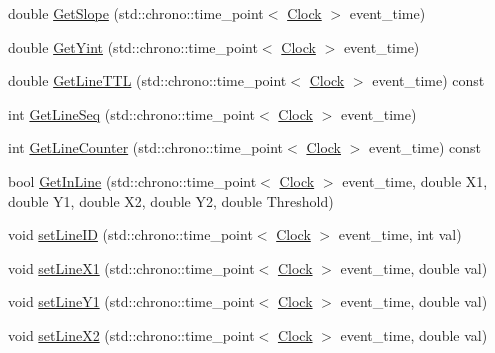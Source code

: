 \begin{DoxyCompactItemize}
\item 
double \mbox{\hyperlink{classLine_a2be3926d47a1a8849007a6c29a603dcf}{Get\+Slope}} (std\+::chrono\+::time\+\_\+point$<$ \mbox{\hyperlink{universe_8h_a0ef8d951d1ca5ab3cfaf7ab4c7a6fd80}{Clock}} $>$ event\+\_\+time)
\item 
double \mbox{\hyperlink{classLine_a5319d68ecb254ff61e2a46d5928aec93}{Get\+Yint}} (std\+::chrono\+::time\+\_\+point$<$ \mbox{\hyperlink{universe_8h_a0ef8d951d1ca5ab3cfaf7ab4c7a6fd80}{Clock}} $>$ event\+\_\+time)
\item 
double \mbox{\hyperlink{classLine_a5b9419146093908e5c7d740ac384fe39}{Get\+Line\+T\+TL}} (std\+::chrono\+::time\+\_\+point$<$ \mbox{\hyperlink{universe_8h_a0ef8d951d1ca5ab3cfaf7ab4c7a6fd80}{Clock}} $>$ event\+\_\+time) const
\item 
int \mbox{\hyperlink{classLine_a8764cb987ec4af839f30411dc47a835a}{Get\+Line\+Seq}} (std\+::chrono\+::time\+\_\+point$<$ \mbox{\hyperlink{universe_8h_a0ef8d951d1ca5ab3cfaf7ab4c7a6fd80}{Clock}} $>$ event\+\_\+time)
\item 
int \mbox{\hyperlink{classLine_ac13c6405cfd2a586633b5a5eece05fff}{Get\+Line\+Counter}} (std\+::chrono\+::time\+\_\+point$<$ \mbox{\hyperlink{universe_8h_a0ef8d951d1ca5ab3cfaf7ab4c7a6fd80}{Clock}} $>$ event\+\_\+time) const
\item 
bool \mbox{\hyperlink{classLine_a4c9d571599ebc5e9b6090b54a338fbde}{Get\+In\+Line}} (std\+::chrono\+::time\+\_\+point$<$ \mbox{\hyperlink{universe_8h_a0ef8d951d1ca5ab3cfaf7ab4c7a6fd80}{Clock}} $>$ event\+\_\+time, double X1, double Y1, double X2, double Y2, double Threshold)
\item 
void \mbox{\hyperlink{classLine_aaa634bf320b9d1c4becb4083cd8324d4}{set\+Line\+ID}} (std\+::chrono\+::time\+\_\+point$<$ \mbox{\hyperlink{universe_8h_a0ef8d951d1ca5ab3cfaf7ab4c7a6fd80}{Clock}} $>$ event\+\_\+time, int val)
\item 
void \mbox{\hyperlink{classLine_ab8df9f66bffc86994db3150a4eb8ed29}{set\+Line\+X1}} (std\+::chrono\+::time\+\_\+point$<$ \mbox{\hyperlink{universe_8h_a0ef8d951d1ca5ab3cfaf7ab4c7a6fd80}{Clock}} $>$ event\+\_\+time, double val)
\item 
void \mbox{\hyperlink{classLine_af236c5ddb0d125b388621b3597266a95}{set\+Line\+Y1}} (std\+::chrono\+::time\+\_\+point$<$ \mbox{\hyperlink{universe_8h_a0ef8d951d1ca5ab3cfaf7ab4c7a6fd80}{Clock}} $>$ event\+\_\+time, double val)
\item 
void \mbox{\hyperlink{classLine_ade959bc4d4f69bb421ed4f69c0d77fb7}{set\+Line\+X2}} (std\+::chrono\+::time\+\_\+point$<$ \mbox{\hyperlink{universe_8h_a0ef8d951d1ca5ab3cfaf7ab4c7a6fd80}{Clock}} $>$ event\+\_\+time, double val)

\end{DoxyCompactItemize}

